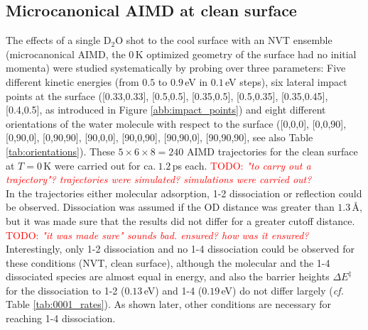 \documentclass[11pt,DIV=13,BCOR=5mm,a4paper,headinclude]{scrbook}
\newcommand\todo[1]{\textcolor{red}{TODO: \textit{{#1}}}}
\begin{document}
\subsection{Microcanonical AIMD at clean surface}\label{sec:mic_clean}
The effects of a single D$_2$O shot to the cool surface with an NVT ensemble (microcanonical AIMD, the $0\,$K optimized geometry of the surface had no initial momenta) were studied systematically by probing over three parameters: Five different kinetic energies (from $0.5$ to $0.9\,$eV in $0.1\,$eV steps), six lateral impact points at the surface ([0.33,0.33], [0.5,0.5], [0.35,0.5], [0.5,0.35], [0.35,0.45], [0.4,0.5], as introduced in Figure \ref{abb:impact_points}) and eight different orientations of the water molecule with respect to the surface ([0,0,0], [0,0,90], [0,90,0], [0,90,90], [90,0,0], [90,0,90], [90,90,0], [90,90,90], see also Table \ref{tab:orientations}).
These $5\times 6\times 8=240$ AIMD trajectories for the clean surface at $T=0\,$K were carried out for ca.$~1.2\,$ps each. \todo{"to carry out a trajectory"? trajectories were simulated? simulations were carried out?}
\\
In the trajectories  either molecular adsorption, 1-2 dissociation or reflection could be observed.
Dissociation was assumed if the OD distance was greater than $1.3\,$\AA{}, but it was made sure that the results did not differ for a greater cutoff distance. \todo{"it was made sure" sounds bad. ensured? how was it ensured?}
Interestingly, only 1-2 dissociation and no 1-4 dissociation could be observed for these conditions (NVT, clean surface), although the molecular and the 1-4 dissociated species are almost equal in energy, and also the barrier heights $\Delta E^\ddagger$ for the dissociation to 1-2 ($0.13\,$eV) and 1-4 ($0.19\,$eV) do not differ largely (\textit{cf.} Table \ref{tab:0001_rates}).
As shown later, other conditions are necessary for reaching 1-4 dissociation.
\\
\end{document}

